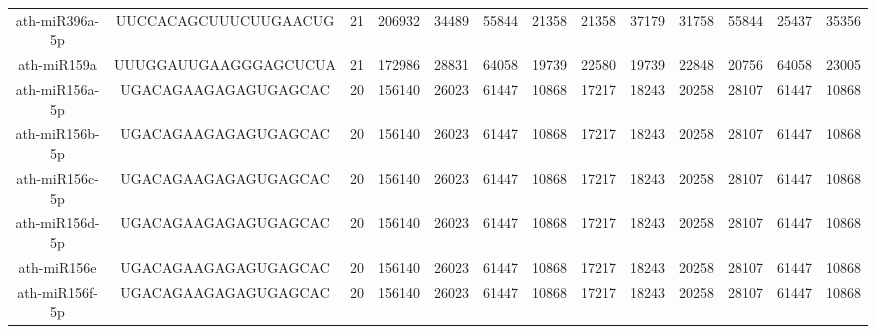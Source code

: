 \begin{landscape}
\begin{table}[]
\begin{tabular}{ccccccccccccc}
    ath-miR396a-5p   & UUCCACAGCUUUCUUGAACUG    & 21           & 206932       & 34489            & 55844        & 21358                        & 21358                & 37179                & 31758                 & 55844                 & 25437                 & 35356                 \\
    ath-miR159a      & UUUGGAUUGAAGGGAGCUCUA    & 21           & 172986       & 28831            & 64058        & 19739                        & 22580                & 19739                & 22848                 & 20756                 & 64058                 & 23005                 \\
    ath-miR156a-5p   & UGACAGAAGAGAGUGAGCAC     & 20           & 156140       & 26023            & 61447        & 10868                        & 17217                & 18243                & 20258                 & 28107                 & 61447                 & 10868                 \\
    ath-miR156b-5p   & UGACAGAAGAGAGUGAGCAC     & 20           & 156140       & 26023            & 61447        & 10868                        & 17217                & 18243                & 20258                 & 28107                 & 61447                 & 10868                 \\
    ath-miR156c-5p   & UGACAGAAGAGAGUGAGCAC     & 20           & 156140       & 26023            & 61447        & 10868                        & 17217                & 18243                & 20258                 & 28107                 & 61447                 & 10868                 \\
    ath-miR156d-5p   & UGACAGAAGAGAGUGAGCAC     & 20           & 156140       & 26023            & 61447        & 10868                        & 17217                & 18243                & 20258                 & 28107                 & 61447                 & 10868                 \\
    ath-miR156e      & UGACAGAAGAGAGUGAGCAC     & 20           & 156140       & 26023            & 61447        & 10868                        & 17217                & 18243                & 20258                 & 28107                 & 61447                 & 10868                 \\
    ath-miR156f-5p   & UGACAGAAGAGAGUGAGCAC     & 20           & 156140       & 26023            & 61447        & 10868                        & 17217                & 18243                & 20258                 & 28107                 & 61447                 & 10868                 \\

\end{tabular}
\end{table}
\end{landscape}
